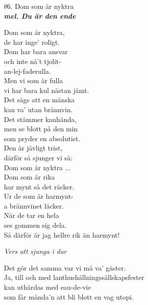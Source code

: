\documentclass[a6paper,10pt]{article}
\newcommand{\mel}[1]{\small\textbf{\textit{mel. #1 \\}}}
\begin{document}
\setlength{\oddsidemargin}{-0.47in}
\begin{center}
\Large $\theta6$. Dom som är nyktra \\ 
\mel{Du är den ende}
\end{center}
Dom som är nyktra,\\
de har inge' roligt.\\
Dom har bara ansvar\\
och inte nå't tjolit-\\
an-lej-faderulla.\\
Men vi som är fulla\\
vi har bara kul nästan jämt.
\vspace{5pt}\\
Det sägs att en mänska\\
kan va' utan brännvin.\\
Det stämmer kanhända,\\
men se blott på den min\\
som pryder en absolutist.\\
Den är jävligt trist,\\
därför så sjunger vi så:
\vspace{5pt}\\
Dom som är nyktra ...
\vspace{5pt}\\
Dom som är rika\\
har mynt så det räcker.\\
Ur de som är harmynt-\\
a brännvinet läcker.\\
När de tar en hela\\
ses gommen sig dela.\\
Så därför är jag hellre rik än harmynt! 
\begin{center}
\textit{Vers att sjunga i dur}
\end{center}
Det gör det samma var vi må va' gäster.\\
Ja, till och med lanthushållningssällskapsfester\\
kan uthärdas med eau-de-vie\\
som får månda'n att bli blott en vag utopi.
\end{document}
